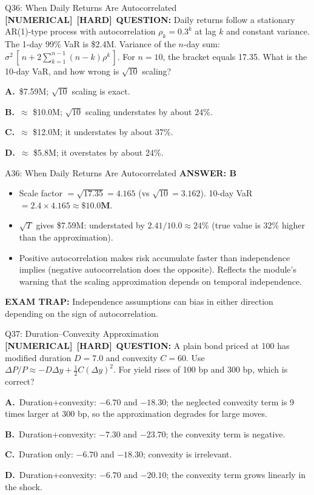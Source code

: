 \documentclass[8pt]{beamer}
\newcommand{\fs}{\fontsize{10}{12}\selectfont}
\newcommand{\opts}[4]{\par\vspace{0.12cm}\noindent\textbf{A.}~#1\par\vspace{0.08cm}\noindent\textbf{B.}~#2\par\vspace{0.08cm}\noindent\textbf{C.}~#3\par\vspace{0.08cm}\noindent\textbf{D.}~#4\par}
\newcommand{\ans}[1]{\textcolor{myblue}{\textbf{ANSWER: #1}}}
\newcommand{\trap}[1]{\textcolor{myred}{\textbf{EXAM TRAP:}} #1}
\newcommand{\numtag}{\textcolor{mypurple}{\textbf{[NUMERICAL]}}}
\newcommand{\hard}{\textcolor{myorange}{\textbf{[HARD]}}}
\begin{document}
\begin{frame}[t]{Q36: When Daily Returns Are Autocorrelated}
\fs
\numtag\ \hard\ \textbf{QUESTION:} Daily returns follow a stationary AR(1)-type process with autocorrelation $\rho_k=0.3^k$ at lag $k$ and constant variance. The 1-day 99\% VaR is \$2.4M. Variance of the $n$-day sum: $\sigma^2\,[\,n+2\sum_{k=1}^{n-1}(n-k)\rho^k\,]$. For $n=10$, the bracket equals 17.35. What is the 10-day VaR, and how wrong is $\sqrt{10}$ scaling?
\opts{\$7.59M; $\sqrt{10}$ scaling is exact.}
{$\approx$ \$10.0M; $\sqrt{10}$ scaling understates by about 24\%.}
{$\approx$ \$12.0M; it understates by about 37\%.}
{$\approx$ \$5.8M; it overstates by about 24\%.}
\end{frame}

\begin{frame}[t]{A36: When Daily Returns Are Autocorrelated}
\fs
\ans{B}
\begin{itemize}
\item Scale factor $=\sqrt{17.35}=4.165$ (vs $\sqrt{10}=3.162$). 10-day VaR $=2.4\times4.165\approx\mathbf{\$10.0M}$.
\item $\sqrt{T}$ gives \$7.59M: understated by $2.41/10.0\approx24\%$ (true value is 32\% higher than the approximation).
\item Positive autocorrelation makes risk accumulate faster than independence implies (negative autocorrelation does the opposite). Reflects the module's warning that the scaling approximation depends on temporal independence.
\end{itemize}
\trap{Independence assumptions can bias in either direction depending on \textcolor{myblue}{the sign of autocorrelation}.}
\end{frame}


\begin{frame}[t]{Q37: Duration--Convexity Approximation}
\fs
\numtag\ \hard\ \textbf{QUESTION:} A plain bond priced at 100 has modified duration $D=7.0$ and convexity $C=60$. Use $\Delta P/P\approx-D\Delta y+\tfrac12C(\Delta y)^2$. For yield rises of 100 bp and 300 bp, which is correct?
\opts{Duration+convexity: $-6.70$ and $-18.30$; the neglected convexity term is 9 times larger at 300 bp, so the approximation degrades for large moves.}
{Duration+convexity: $-7.30$ and $-23.70$; the convexity term is negative.}
{Duration only: $-6.70$ and $-18.30$; convexity is irrelevant.}
{Duration+convexity: $-6.70$ and $-20.10$; the convexity term grows linearly in the shock.}
\end{frame}
\end{document}
